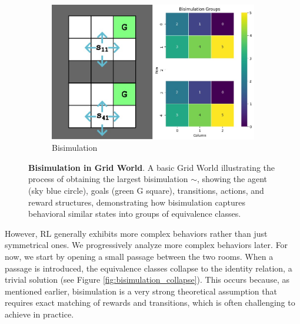 \begin{figure}[h]
    \hfill
    \begin{subfigure}{0.6\textwidth}
        \includegraphics[width=\linewidth]{Figures/bisimulation.jpg}
        \caption{Bisimulation}
        \label{fig:bisimulation_grid_world}
    \end{subfigure}
    \caption[Bisimulation in Grid World]{\textbf{Bisimulation in Grid World}. A basic Grid World illustrating the process of obtaining the largest bisimulation $\sim$, showing the agent (sky blue circle), goals (green G square), transitions, actions, and reward structures, demonstrating how bisimulation captures behavioral similar states into groups of equivalence classes.}


    \label{fig:outdated_priorities}
\end{figure}


However, RL generally exhibits more complex behaviors rather than just symmetrical ones. We progressively analyze more complex behaviors later. For now, we start by opening a small passage between the two rooms. When a passage is introduced, the equivalence classes collapse to the identity relation, a trivial solution (see Figure \ref{fig:bisimulation_collapse}). This occurs because, as mentioned earlier, bisimulation is a very strong theoretical assumption that requires exact matching of rewards and transitions, which is often challenging to achieve in practice.


